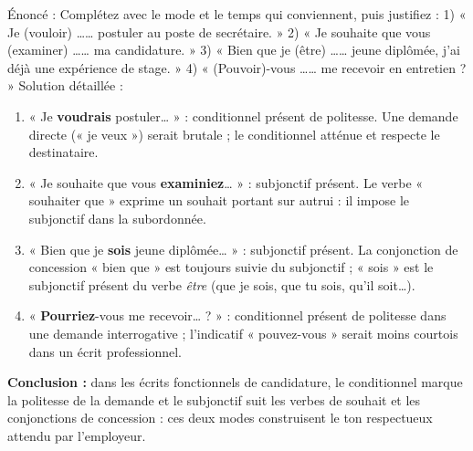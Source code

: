 \documentclass[11pt]{article}
\newcommand{\cle}[1]{{\popxbold\color{popdark}#1}}
\begin{document}
\begin{exoresolu}
Énoncé : Complétez avec le mode et le temps qui conviennent, puis justifiez : 1) « Je (vouloir) …… postuler au poste de secrétaire. » 2) « Je souhaite que vous (examiner) …… ma candidature. » 3) « Bien que je (être) …… jeune diplômée, j'ai déjà une expérience de stage. » 4) « (Pouvoir)-vous …… me recevoir en entretien ? »
\tcblower
Solution détaillée :
\begin{enumerate}
\item « Je \textbf{voudrais} postuler… » : \cle{conditionnel présent} de politesse. Une demande directe (« je veux ») serait brutale ; le conditionnel atténue et respecte le destinataire.
\item « Je souhaite que vous \textbf{examiniez}… » : \cle{subjonctif présent}. Le verbe « souhaiter que » exprime un souhait portant sur autrui : il impose le subjonctif dans la subordonnée.
\item « Bien que je \textbf{sois} jeune diplômée… » : \cle{subjonctif présent}. La conjonction de concession « bien que » est toujours suivie du subjonctif ; « sois » est le subjonctif présent du verbe \emph{être} (que je sois, que tu sois, qu'il soit…).
\item « \textbf{Pourriez}-vous me recevoir… ? » : \cle{conditionnel présent} de politesse dans une demande interrogative ; l'indicatif « pouvez-vous » serait moins courtois dans un écrit professionnel.
\end{enumerate}
\textbf{Conclusion :} dans les écrits fonctionnels de candidature, le conditionnel marque la politesse de la demande et le subjonctif suit les verbes de souhait et les conjonctions de concession : ces deux modes construisent le ton respectueux attendu par l'employeur.
\end{exoresolu}
\end{document}
